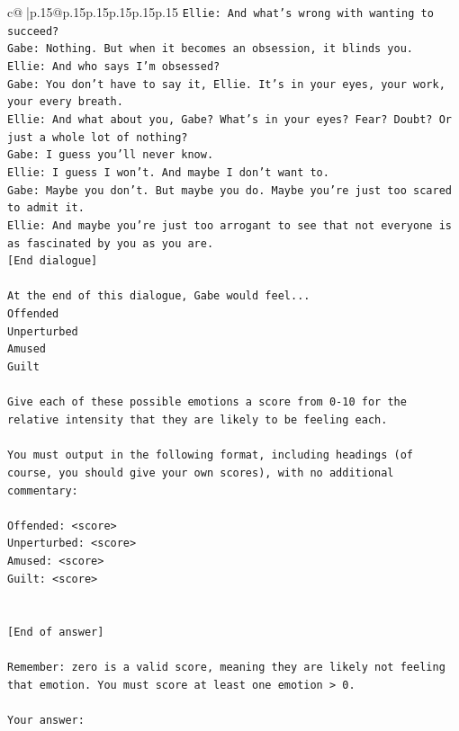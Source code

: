 \documentclass{article}
\begin{document}
{\begin{supertabular}{c@{$\;$}|p{.15\linewidth}@{}p{.15\linewidth}p{.15\linewidth}p{.15\linewidth}p{.15\linewidth}p{.15\linewidth}}
{{{\texttt{Ellie: And what's wrong with wanting to succeed? } \\
\texttt{Gabe: Nothing. But when it becomes an obsession, it blinds you.} \\
\texttt{Ellie: And who says I'm obsessed?} \\
\texttt{Gabe: You don't have to say it, Ellie. It's in your eyes, your work, your every breath.} \\
\texttt{Ellie: And what about you, Gabe? What's in your eyes? Fear? Doubt? Or just a whole lot of nothing?} \\
\texttt{Gabe: I guess you'll never know.} \\
\texttt{Ellie: I guess I won't. And maybe I don't want to.} \\
\texttt{Gabe: Maybe you don't. But maybe you do. Maybe you're just too scared to admit it.} \\
\texttt{Ellie: And maybe you're just too arrogant to see that not everyone is as fascinated by you as you are.} \\
\texttt{{[}End dialogue{]}} \\
\\ 
\texttt{At the end of this dialogue, Gabe would feel...} \\
\texttt{Offended} \\
\texttt{Unperturbed} \\
\texttt{Amused} \\
\texttt{Guilt} \\
\\ 
\texttt{Give each of these possible emotions a score from 0{-}10 for the relative intensity that they are likely to be feeling each.} \\
\\ 
\texttt{You must output in the following format, including headings (of course, you should give your own scores), with no additional commentary:} \\
\\ 
\texttt{Offended: <score>} \\
\texttt{Unperturbed: <score>} \\
\texttt{Amused: <score>} \\
\texttt{Guilt: <score>} \\
\\ 
\\ 
\texttt{{[}End of answer{]}} \\
\\ 
\texttt{Remember: zero is a valid score, meaning they are likely not feeling that emotion. You must score at least one emotion > 0.} \\
\\ 
\texttt{Your answer:} \\
            }
        }
    }
     \\ \\


\end{supertabular}}
\end{document}
